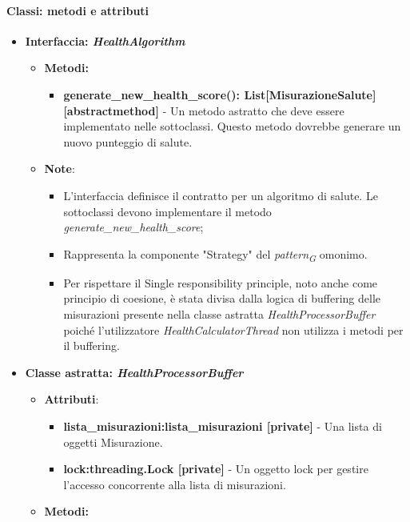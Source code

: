 \paragraph{Classi: metodi e attributi}
\begin{itemize}
    \item{\textbf{Interfaccia: \textit{HealthAlgorithm}}}
    \begin{itemize}
    \item \textbf{Metodi: }
    \begin{itemize}
        \item \textbf{generate\_new\_health\_score(): List[MisurazioneSalute] [abstractmethod]} - Un metodo astratto che deve essere implementato nelle sottoclassi. Questo metodo dovrebbe generare un nuovo punteggio di salute.
    \end{itemize}
    \item\textbf{Note}:
        \begin{itemize}
            \item L'interfaccia definisce il contratto per un algoritmo di salute. Le sottoclassi devono implementare il metodo \textit{generate\_new\_health\_score};
            \item Rappresenta la componente "Strategy" del \textit{pattern}\textsubscript{\textit{G}} omonimo.
            \item Per rispettare il Single responsibility principle, noto anche come principio di coesione, è stata divisa dalla logica di buffering delle misurazioni presente nella classe astratta \textit{HealthProcessorBuffer} poiché l'utilizzatore \textit{HealthCalculatorThread} non utilizza i metodi per il buffering.
        \end{itemize}
    \end{itemize}
    \item\textbf{Classe astratta: \textit{HealthProcessorBuffer}}
    \begin{itemize}
    \item\textbf{Attributi}:
        \begin{itemize}
        \item \textbf{lista\_misurazioni:lista\_misurazioni [private]} - Una lista di oggetti Misurazione.
        \item \textbf{lock:threading.Lock [private]} - Un oggetto lock per gestire l'accesso concorrente alla lista di misurazioni.
    \end{itemize}
    \item \textbf{Metodi: }
    \begin{itemize}

\end{itemize}
\end{itemize}
\end{itemize}
